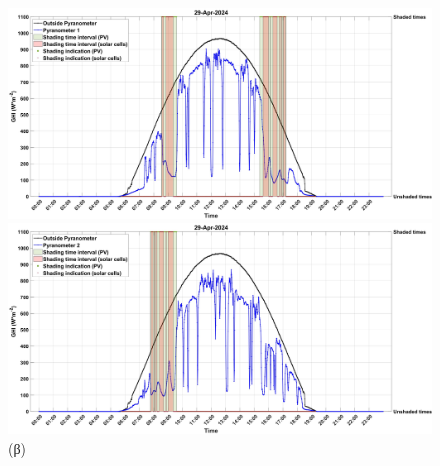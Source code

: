 \documentclass[12pt, a4paper]{report} %
\begin{document}
\begin{figure}[H]
    \begin{adjustwidth}{-0.7cm}{0cm}
        \begin{minipage}{0.5\textwidth}
            \centering
            \includegraphics[scale=0.085]{29_Apr_GHI_1.jpg}
            \caption*{\hspace{35pt}(α)}{}
        \end{minipage}
        \hfill
        \begin{minipage}[c]{0.5\textwidth}
            \centering
            \includegraphics[scale=0.085]{29_Apr_GHI_2.jpg}
            \caption*{\hspace{35pt}(β)}{}
        \end{minipage}

        \medskip


\end{adjustwidth}
\end{figure}
\end{document}

